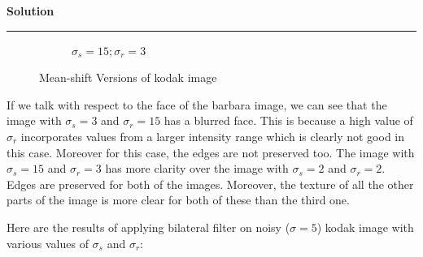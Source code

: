 \documentclass[a4paper,12pt]{article}
\newenvironment{solution}[2][]{%
    \begin{mdframed}[linecolor=green!60!black, linewidth=2pt, roundcorner=10pt, backgroundcolor=green!5!white, skipabove=12pt, skipbelow=12pt]%
        \textbf{\large #2} %
        \par\noindent\rule{\textwidth}{0.4pt} %
        \vspace{0.5em} %
}{%
    \end{mdframed}%
}
\begin{document}
\begin{solution}{Solution}
\begin{figure}[H]
\begin{subfigure}[b]{0.24\textwidth}
        \caption{$\sigma_s=15;\sigma_r=3$}
        \label{fig:subfig3}
    \end{subfigure}
    
    \caption{Mean-shift Versions of kodak image }
    \label{fig:overall}
\end{figure}

If we talk with respect to the face of the barbara image, we can see that the image with $\sigma_s=3$ and $\sigma_r=15$ has a blurred face. This is because a high value of $\sigma_r$ incorporates values from a larger intensity range which is clearly not good in this case. Moreover for this case, the edges are not preserved too. The image with $\sigma_s=15$ and $\sigma_r=3$ has more clarity over the image with $\sigma_s=2$ and $\sigma_r=2$. Edges are preserved for both of the images. Moreover, the texture of all the other parts of the image is more clear for both of these than the third one.


Here are the results of applying bilateral filter on noisy ($\sigma = 5$) kodak image with various values of $\sigma_s$ and $\sigma_r$:


\end{solution}
\end{document}
